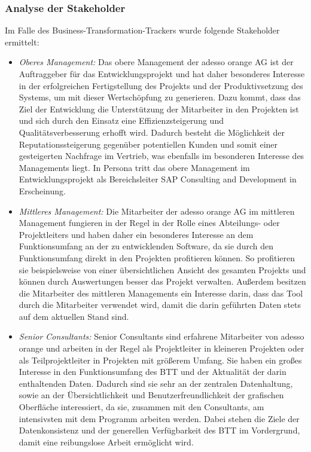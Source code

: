 \subsubsection{Analyse der Stakeholder}
Im Falle des Business-Transformation-Trackers wurde folgende Stakeholder ermittelt:
\begin{itemize}
    \item[] \emph{Oberes Management:} Das obere Management der adesso orange AG ist der Auftraggeber für das Entwicklungsprojekt und hat daher besonderes Interesse in der erfolgreichen Fertigstellung des Projekts und der Produktivsetzung des Systems, um mit dieser Wertschöpfung zu generieren. Dazu kommt, dass das Ziel der Entwicklung die Unterstützung der Mitarbeiter in den Projekten ist und sich durch den Einsatz eine Effizienzsteigerung und Qualitätsverbesserung erhofft wird. Dadurch besteht die Möglichkeit der Reputationssteigerung gegenüber potentiellen Kunden und somit einer gesteigerten Nachfrage im Vertrieb, was ebenfalls im besonderen Interesse des Managements liegt. In Persona tritt das obere Management im Entwicklungsprojekt als Bereichsleiter \glqq{}SAP Consulting and Development\grqq{} in Erscheinung.
    \item[] \emph{Mittleres Management:} Die Mitarbeiter der adesso orange AG im mittleren Management fungieren in der Regel in der Rolle eines Abteilungs- oder Projektleiters und haben daher ein besonderes Interesse an dem Funktionsumfang an der zu entwicklenden Software, da sie durch den Funktionsumfang direkt in den Projekten profitieren können. So profitieren sie beispielsweise von einer übersichtlichen Ansicht des gesamten Projekts und können durch Auswertungen besser das Projekt verwalten. Außerdem besitzen die Mitarbeiter des mittleren Managements ein Interesse darin, dass das Tool durch die Mitarbeiter verwendet wird, damit die darin geführten Daten stets auf dem aktuellen Stand sind. 
    \item[] \emph{Senior Consultants:} Senior Consultants sind erfahrene Mitarbeiter von adesso orange und arbeiten in der Regel als Projektleiter in kleineren Projekten oder als Teilprojektleiter in Projekten mit größerem Umfang. Sie haben ein großes Interesse in den Funktionsumfang des BTT und der Aktualität der darin enthaltenden Daten. Dadurch sind sie sehr an der zentralen Datenhaltung, sowie an der Übersichtlichkeit und Benutzerfreundlichkeit der grafischen Oberfläche interessiert, da sie, zusammen mit den Consultants, am intensivsten mit dem Programm arbeiten werden. Dabei stehen die Ziele der Datenkonsistenz und der generellen Verfügbarkeit des BTT im Vordergrund, damit eine reibungslose Arbeit ermöglicht wird.

\end{itemize}
